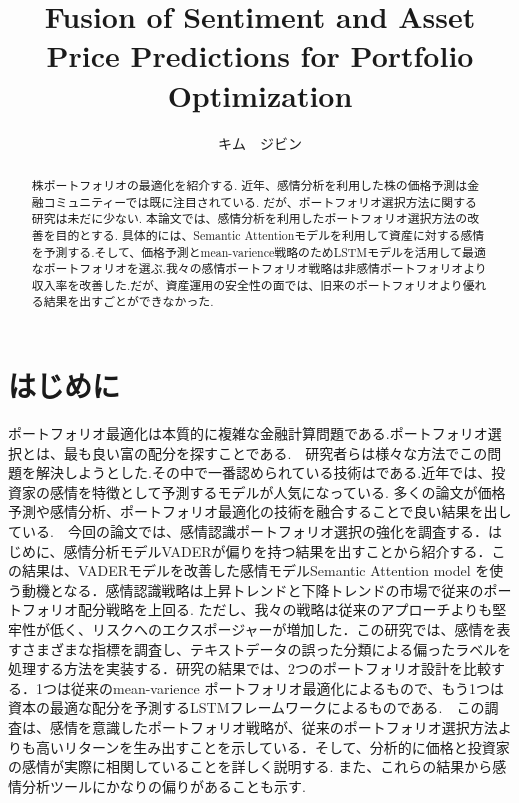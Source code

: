 \documentclass[submit,techrep,noauthor]{ipsj}
\begin{document}
\title{Fusion of Sentiment and Asset Price Predictions for Portfolio Optimization}


\author{キム　ジビン}{}{} %

\begin{abstract}
株ポートフォリオの最適化を紹介する. 近年、感情分析を利用した株の価格予測は金融コミュニティーでは既に注目されている. だが、ポートフォリオ選択方法に関する研究は未だに少ない. 
本論文では、感情分析を利用したポートフォリオ選択方法の改善を目的とする. 具体的には、Semantic Attentionモデルを利用して資産に対する感情を予測する.そして、価格予測とmean-varience戦略のためLSTMモデルを活用して最適なポートフォリオを選ぶ.我々の感情ポートフォリオ戦略は非感情ポートフォリオより収入率を改善した.だが、資産運用の安全性の面では、旧来のポートフォリオより優れる結果を出すごとができなかった.
\end{abstract}


\maketitle

\section{はじめに}
ポートフォリオ最適化は本質的に複雑な金融計算問題である.ポートフォリオ選択とは、最も良い富の配分を探すことである.　研究者らは様々な方法でこの問題を解決しようとした.その中で一番認められている技術は\cite{first}である.近年では、投資家の感情を特徴として予測するモデルが人気になっている. \cite{second}多くの論文が価格予測や感情分析、ポートフォリオ最適化の技術を融合することで良い結果を出している.　今回の論文では、感情認識ポートフォリオ選択の強化を調査する．はじめに、感情分析モデルVADERが偏りを持つ結果を出すことから紹介する．この結果は、VADERモデルを改善した感情モデルSemantic Attention model を使う動機となる．感情認識戦略は上昇トレンドと下降トレンドの市場で従来のポートフォリオ配分戦略を上回る. ただし、我々の戦略は従来のアプローチよりも堅牢性が低く、リスクへのエクスポージャーが増加した．この研究では、感情を表すさまざまな指標を調査し、テキストデータの誤った分類による偏ったラベルを処理する方法を実装する．研究の結果では、2つのポートフォリオ設計を比較する．1つは従来のmean-varience ポートフォリオ最適化によるもので、もう1つは資本の最適な配分を予測するLSTMフレームワークによるものである.　この調査は、感情を意識したポートフォリオ戦略が、従来のポートフォリオ選択方法よりも高いリターンを生み出すことを示している．そして、分析的に価格と投資家の感情が実際に相関していることを詳しく説明する. また、これらの結果から感情分析ツールにかなりの偏りがあることも示す.
\end{document}
